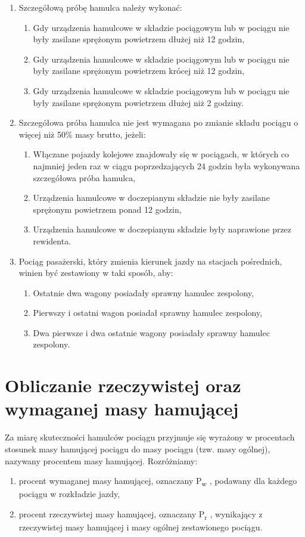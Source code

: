 \begin{tcolorbox}[colback=black!5!white,colframe=white!55!black,title=Pytania testowe]
	\begin{enumerate}
		\item Szczegółową próbę hamulca należy wykonać:
		\begin{enumerate}
			\item Gdy urządzenia hamulcowe w składzie pociągowym lub w pociągu nie były zasilane sprężonym powietrzem dłużej niż 12 godzin,
			\item Gdy urządzenia hamulcowe w składzie pociągowym lub w pociągu nie były zasilane sprężonym powietrzem krócej niż 12 godzin,
			\item Gdy urządzenia hamulcowe w składzie pociągowym lub w pociągu nie były zasilane sprężonym powietrzem dłużej niż 2 godziny.
		\end{enumerate}
		\item Szczegółowa próba hamulca nie jest wymagana po zmianie składu pociągu o więcej niż 50\% masy brutto, jeżeli:
		\begin{enumerate}
			\item Włączane pojazdy kolejowe znajdowały się w pociągach, w których co najmniej jeden raz w ciągu poprzedzających 24 godzin była wykonywana szczegółowa próba hamulca,
			\item Urządzenia hamulcowe w doczepianym składzie nie były zasilane sprężonym  powietrzem ponad 12 godzin,
			\item Urządzenia hamulcowe w doczepianym składzie były naprawione przez rewidenta.
		\end{enumerate}
		\item Pociąg pasażerski, który zmienia kierunek jazdy na stacjach pośrednich,  winien    być zestawiony w taki sposób, aby:
		\begin{enumerate}
			\item Ostatnie dwa wagony posiadały sprawny hamulec zespolony, 
			\item Pierwszy i ostatni wagon posiadał sprawny hamulec zespolony,
			\item Dwa pierwsze i dwa ostatnie wagony posiadały sprawny hamulec zespolony.
		\end{enumerate}
	\end{enumerate}
\end{tcolorbox}

\chapter{Obliczanie rzeczywistej oraz wymaganej masy hamującej}
Za miarę skuteczności hamulców pociągu przyjmuje się wyrażony w procentach stosunek masy hamującej pociągu do masy pociągu (tzw. masy ogólnej),
nazywany procentem masy hamującej. Rozróżniamy:
\begin{enumerate}
	\item procent wymaganej masy hamującej, oznaczany P\textsubscript{w} , podawany dla każdego pociągu w rozkładzie jazdy,
	\item procent rzeczywistej masy hamującej, oznaczany P\textsubscript{r} , wynikający z rzeczywistej masy hamującej i masy ogólnej zestawionego pociągu.
\end{enumerate}

